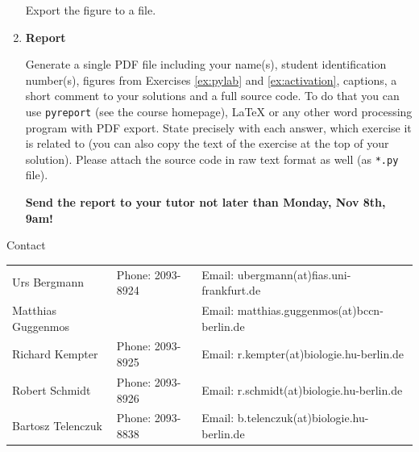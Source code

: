 \documentclass[12pt, a4]{article}
\begin{document}
\begin{enumerate}
\begin{enumerate}
        \end{enumerate}
    
        Export the figure to a file.

    \item \textbf {Report}

    Generate a single PDF file including your name(s), student identification number(s), figures from Exercises \ref{ex:pylab} and \ref{ex:activation}, captions, a short comment to your solutions and a full source code. To do that you can use  \texttt{pyreport} (see the course homepage), LaTeX or any other word processing program with PDF export. State precisely with each answer, which exercise it is related to (you can also copy the text of the exercise at the top of your solution). Please attach the source code in raw text format as well (as \texttt{*.py} file).
    
    \textbf{Send the report to your tutor not later than Monday, Nov
    8th, 9am!} 
\end{enumerate}

\vfill
\centerline{\CAP Contact}
\CAP

\begin{tabular}{lll}
Urs Bergmann & Phone: 2093-8924 & Email: ubergmann(at)fias.uni-frankfurt.de \\
Matthias Guggenmos & & Email: matthias.guggenmos(at)bccn-berlin.de \\
Richard Kempter \hfill & Phone: 2093-8925 \hfill & Email: r.kempter(at)biologie.hu-berlin.de \\
Robert Schmidt & Phone: 2093-8926 & Email: r.schmidt(at)biologie.hu-berlin.de \\
Bartosz Telenczuk & Phone: 2093-8838 & Email: b.telenczuk(at)biologie.hu-berlin.de \\
\end{tabular}
\end{document}
